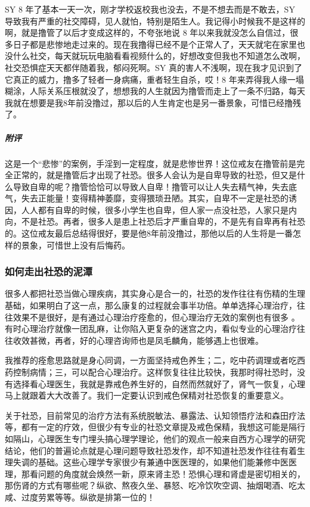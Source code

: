 \begin{case}[社恐]
    SY 8 年了基本一天一次，刚才学校返校我也没去，不是不想去而是不敢去，SY 导致我有严重的社交障碍，见人就怕，特别是陌生人。我记得小时候我不是这样的啊，就是撸管了以后才变成这样的，不夸张地说 8 年以来我就没怎么自信过，很多日子都是悲惨地走过来的。现在我撸得已经不是个正常人了，天天就宅在家里也没什么社交，每天就玩玩电脑看看视频什么的，好想改变但我也不知道怎么改啊，社交恐惧症天天都伴随着我，郁闷死啊。SY 真的害人不浅啊，现在我才见识到了它真正的威力，撸多了轻者一身病痛，重者轻生自杀，哎！8 年来弄得我人缘一塌糊涂，人际关系压根就没了，想想我的人生就因为撸管而走上了一条不归路，每天我就在想要是我8年前没撸过，那以后的人生肯定也是另一番景象，可惜已经撸残了。
    \subparagraph{附评} 这是一个“悲惨”的案例，手淫到一定程度，就是悲惨世界！这位戒友在撸管前是完全正常的，就是撸管后才出现了社恐。很多人会认为是自卑导致的社恐，但又是什么导致自卑的呢？撸管恰恰可以导致人自卑！撸管可以让人失去精气神，失去底气，失去正能量！变得精神萎靡，变得猥琐丑陋。其实，自卑不一定是社恐的诱因，人人都有自卑的时候，很多小学生也自卑，但人家一点没社恐，人家只是内向，不是社恐。再者，很多人是患上社恐后才严重自卑的，不是先有自卑再有社恐的。这位戒友最后总结得很好，要是他8年前没撸过，那他以后的人生将是一番怎样的景象，可惜世上没有后悔药。
\end{case}

\subsubsection{如何走出社恐的泥潭}

很多人都把社恐当做心理疾病，其实身心是合一的，社恐的发作往往有伤精的生理基础，如果明白了这一点，那么康复的过程就会事半功倍。单单选择心理治疗，往往效果不是很好，是有通过心理治疗痊愈的，但心理治疗无效的案例也有很多 。有时心理治疗就像一团乱麻，让你陷入更复杂的迷宫之内，看似专业的心理治疗往往收效甚微，再者，好的心理咨询师也是凤毛麟角，能够遇上也很难。

我推荐的痊愈思路就是身心同调，一方面坚持戒色养生；二，吃中药调理或者吃西药控制病情；三，可以配合心理治疗。这样恢复往往比较快，我那时得社恐时，没有选择看心理医生，我就是靠戒色养生好的，自然而然就好了，肾气一恢复，心理马上就跟着大大改善了。我们一定要认识到戒色保精对社恐恢复的重要意义。

关于社恐，目前常见的治疗方法有系统脱敏法、暴露法、认知领悟疗法和森田疗法等，都有一定的疗效，但很少有专业的社恐文章提及戒色保精，我想这可能是隔行如隔山，心理医生专门埋头搞心理学理论，他们的观点一般来自西方心理学的研究结论，他们的普遍论点就是心理问题导致社恐发作，却不知道社恐发作往往有着生理失调的基础。这些心理学专家很少有兼通中医医理的，如果他们能兼修中医医理，那看问题的角度就会焕然一新，原来肾主恐！恐惧心理和肾虚是密切相关的，那伤肾的方式有哪些呢？纵欲、熬夜久坐、暴怒、吃冷饮吹空调、抽烟喝酒、吃太咸、过度劳累等等。纵欲是排第一位的！

